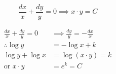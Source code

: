 \documentclass[14pt,fleqn]{extarticle}
\begin{document}
 
\begin{snippet}
    \correct
    
    \[ \frac{dx}{x} + \frac{dy}{y} = 0 \implies x\cdot y = C \]
    
    \reason
    
    \begin{align}
	\frac{dx}{x} + \frac{dy}{y} = 0 &\implies \frac{dy}{y} = -\frac{dx}{x} \\
	\therefore \log y &= -\log x + k \\
	\log y + \log x &= \log \left(x\cdot y \right) = k \\
	\text{or } x\cdot y &= e^k = C  
\end{align}
    
\end{snippet} 
\end{document}
